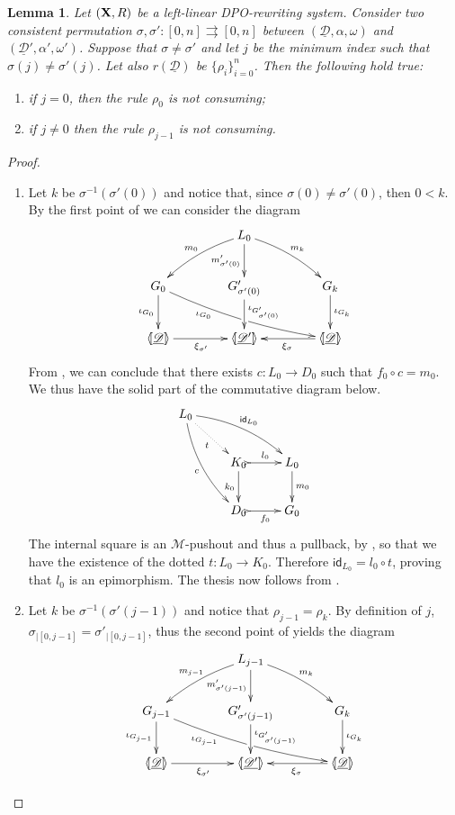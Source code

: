 \documentclass[a4paper]{article}
\newcommand{\id}[1]{\mathsf{id}_{#1}}
\def\X{\textbf {\textup{X}}}
\newcommand{\dder}[1]{\mathscr{#1}}
\newcommand{\der}[1]{\underline{\dder{#1}}}
\newcommand{\lpro}{\langle \hspace{-1.85pt}[}
\newcommand{\rpro}{]\hspace{-1.85pt}\rangle}
\newcommand{\tpro}[1]{\lpro \der{#1}\rpro}
\newtheorem{lemma}[theorem]{Lemma}
\theoremstyle{definition}
\begin{document}
\begin{lemma} Let $(\X,R)$ be a left-linear DPO-rewriting system. Consider two consistent permutation $\sigma,\sigma'\colon [0,n]\rightrightarrows [0,n]$ between $(\der{D}, \alpha, \omega)$ and $(\der{D}', \alpha', \omega')$. Suppose that $\sigma\neq \sigma'$ and let $j$ be the minimum index such that $\sigma(j)\neq \sigma'(j)$. Let also $r(\der{D})$ be $\{\rho_i\}_{i=0}^n$. Then the following hold true:
	\begin{enumerate}
		\item if $j=0$, then the rule $\rho_0$ is not consuming;
		\item if $j\neq 0$ then the rule $\rho_{j-1}$ is not consuming.
	\end{enumerate}
\end{lemma}
\begin{proof}\begin{enumerate}
		\item Let $k$ be $\sigma^{-1}(\sigma'(0))$ and notice that, since $\sigma(0)\neq \sigma'(0)$, then $0< k$.  By  the first point of   we can consider the diagram
		\[\xymatrix@C=40pt{& L_0 \ar[d]_{m'_{\sigma'(0)}} \ar@/^.2cm/[dr]^{m_{k}} \ar@/_.2cm/[dl]_{m_{0}} \\G_{0} \ar@/_.2cm/[drr]_(.3){\iota_{G_0}}|(.515)\hole \ar[d]_{\iota_{G_0}}& G'_{\sigma'(0)} \ar[d]^{\iota_{G'_{\sigma'(0)}}} & G_{k} \ar[d]^{\iota_{G_k}}\\ \tpro{D} \ar[r]_{\xi_{\sigma'}} & \lpro \der{D'}\rpro & \tpro{D} \ar[l]^{\xi_{\sigma}}}\]
	From , we can conclude that there exists $c\colon L_0\to D_0$ such that $f_0\circ c=m_0$. We thus have the solid part of the commutative diagram below.
		\[\xymatrix{L_0 \ar@/^.3cm/[drr]^{\id{L_0}} \ar@{.>}[dr]_{t} \ar@/_.3cm/[ddr]_{c}\\ & K_0 \ar[d]_{k_0}\ar@{>->}[r]^{l_0}& L_0 \ar[d]^{m_0} \\& D_0 \ar@{>->}[r]_{f_0} & G_0} \]
		The internal square is an $\mathcal{M}$-pushout and thus a pullback, by , so that we have the existence of the dotted $t\colon L_0\to K_0$. Therefore $\id{L_0}=l_0\circ t$, proving that $l_0$ is an epimorphism. The thesis now follows from .  
		\item  Let $k$ be $\sigma^{-1}(\sigma'(j-1))$ and notice that $\rho_{j-1}=\rho_k$. By definition of $j$, $\sigma_{|[0,j-1]}=\sigma'_{|[0,j-1]}$, thus the second point of  yields the diagram
			\[\xymatrix@C=40pt{& L_{j-1} \ar[d]_{m'_{\sigma'(j-1)}} \ar@/^.2cm/[dr]^{m_{k}} \ar@/_.2cm/[dl]_{m_{j-1}} \\G_{j-1} \ar@/_.2cm/[drr]_(.3){\iota_{G_{j-1}}}|(.515)\hole \ar[d]_{\iota_{G_{j-1}}}& G'_{\sigma'(j-1)} \ar[d]^{\iota_{G'_{\sigma'(j-1)}}} & G_{k} \ar[d]^{\iota_{G_k}}\\ \tpro{D} \ar[r]_{\xi_{\sigma'}} & \lpro \der{D'}\rpro & \tpro{D} \ar[l]^{\xi_{\sigma}}}\]

\end{enumerate}
\end{proof}
\end{document}
